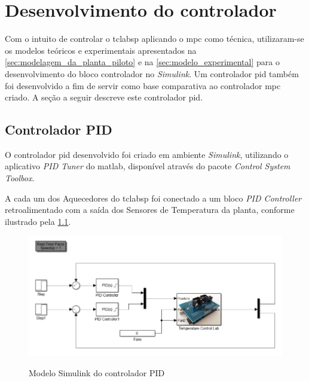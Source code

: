 \chapter{Desenvolvimento do controlador}
\label{ch:desenvolvimento_controlador}

Com o intuito de controlar o \acrshort{tclabsp} aplicando o \acrshort{mpc} como técnica,
utilizaram-se os modelos teóricos e experimentais apresentados na \cref{sec:modelagem_da_planta_piloto}
e na \cref{sec:modelo_experimental} para o desenvolvimento do bloco controlador no \textit{Simulink}.
Um controlador \acrshort{pid} também foi desenvolvido a fim de servir como base comparativa ao
controlador \acrshort{mpc} criado.
A seção a seguir descreve este controlador \acrshort{pid}.

\section{Controlador PID}
\label{sec:controlador_pid}

O controlador \acrshort{pid} desenvolvido foi criado em ambiente \textit{Simulink},
utilizando o aplicativo \textit{PID Tuner} do \acrshort{matlab}, disponível através do pacote
\textit{Control System Toolbox}.

A cada um dos Aquecedores do \acrshort{tclabsp} foi conectado a um bloco \textit{PID Controller} retroalimentado
com a saída dos Sensores de Temperatura da planta, conforme ilustrado pela \cref{fig:pidcreation}.

\begin{figure}[h]
	\caption{Modelo Simulink do controlador PID}
	\begin{center}
		\includegraphics[width=1.00\textwidth]{./5_images/PIDCreation.png} 
		\label{fig:pidcreation}
	\end{center}
	\centering
\end{figure}

